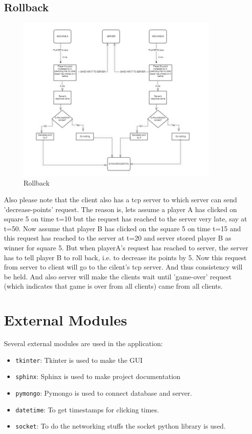 \documentclass[manuscript,screen,review,nonacm]{acmart}
\begin{document}
\subsection{Rollback}
\begin{figure}[htp]
    \centering
    \includegraphics[width=10cm]{rollback.jpeg}
    \caption{Rollback}
    \label{fig:galaxy}
\end{figure}
Also please note that the client also has a tcp server to which server can send 'decrease-points' request. The reason is, lets assume a player A has clicked on square 5 on time t=10 but the request has reached to the server very late, say at t=50. Now assume that player B has clicked on the square 5 on time t=15 and this request has reached to the server at t=20 and server stored player B as winner for square 5. But when playerA's request has reached to server, the server has to tell player B to roll back, i.e. to decrease its points by 5. Now this request from server to client will go to the cilent's tcp server. And thus consistency will be held. And also server will make the clients wait until 'game-over' request (which indicates that game is over from all clients) came from all clients. 

\section{External Modules}
Several external modules are used in the application:
\begin{itemize}
\item {\verb|tkinter|}: Tkinter is used to make the GUI 
\item {\verb|sphinx|}: Sphinx is used to make project documentation
\item{\verb|pymongo|}: Pymongo is used to connect database and server.
\item{\verb|datetime|}: To get timestamps for clicking times.
\item{\verb|socket|}: To do the networking stuffs the socket python library is used.
\end{itemize}
\end{document}
